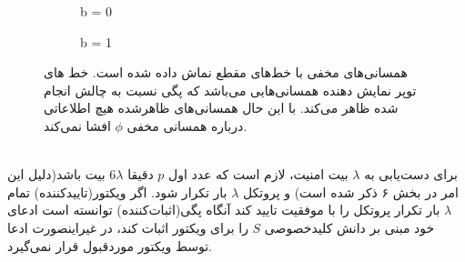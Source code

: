 \begin{figure}[ H]
	\centering
	\begin{subfigure}{0.4\textwidth}
		\centering
		\caption{b = 0}
		\label{fig:sub1}
		
	\end{subfigure}
	
	\begin{subfigure}{0.4\textwidth}
		\centering
		\caption{b = 1}
		\label{fig:sub2}
		
	\end{subfigure}%
	\caption{
		همسانی‌های مخفی با خط‌های مقطع نماش داده شده است. خط های توپر نمایش دهنده همسانی‌هایی می‌باشد که پگی نسبت به چالش انجام شده ظاهر می‌کند. با این حال همسانی‌های ظاهرشده هیچ اطلاعاتی درباره همسانی مخفی
		$\phi$
		افشا نمی‌کند.	
	}
	\label{fig:challenge}
\end{figure}~
\\
 برای دست‌یابی به 
$\lambda$
بیت امنیت، لازم است که عدد اول
$p$
دقیقا 
$6\lambda$
بیت باشد(دلیل این امر در بخش ۶ ذکر شده است) و پروتکل 
$\lambda$
بار تکرار شود. اگر ویکتور(تاییدکننده) تمام
$\lambda$
بار تکرار پروتکل را با موفقیت تایید کند آنگاه پگی(اثبات‌کننده) توانسته است ادعای خود مبنی بر دانش کلیدخصوصی
$S$
را برای ویکتور اثبات کند، در غیراینصورت ادعا توسط ویکتور موردقبول قرار نمی‌گیرد.
